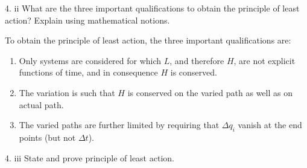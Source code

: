 \documentclass[12pt]{article}
\begin{document}
\begin{prob}{4. ii}
    What are the three important qualifications to obtain the principle of least action? Explain using mathematical notions.
\end{prob}
\begin{soln}
    To obtain the principle of least action, the three important qualifications are:
    \begin{enumerate}
        \item Only systems are considered for which \(L\), and therefore \(H\), are not explicit functions of time, and in consequence \(H\) is conserved.
        \item The variation is such that \(H\) is conserved on the varied path as well as on actual path.
        \item The varied paths are further limited by requiring that \(\Delta q_i\) vanish at the end points (but not \(\Delta t\)).
    \end{enumerate}
\end{soln}
\begin{prob}{4. iii}
    State and prove principle of least action.
\end{prob}
\end{document}
